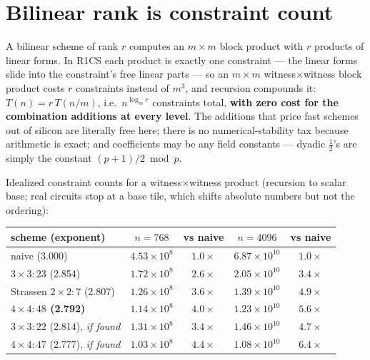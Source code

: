 \documentclass[10pt]{article}
\begin{document}
\section{Bilinear rank is constraint count}\label{sec:rank}

A bilinear scheme of rank $r$ computes an $m\times m$ block product
with $r$ products of linear forms. In R1CS each product is exactly
one constraint --- the linear forms slide into the constraint's free
linear parts --- so an $m\times m$ witness$\times$witness block
product costs $r$ constraints instead of $m^3$, and recursion
compounds it: $T(n) = r\,T(n/m)$, i.e.\ $n^{\log_m r}$ constraints
total, \textbf{with zero cost for the combination additions at every
level}. The additions that price fast schemes out of silicon are
literally free here; there is no numerical-stability tax because
arithmetic is exact; and coefficients may be any field constants ---
dyadic $\tfrac12$'s are simply the constant $(p+1)/2 \bmod p$.

Idealized constraint counts for a witness$\times$witness product
(recursion to scalar base; real circuits stop at a base tile, which
shifts absolute numbers but not the ordering):

\begin{center}
\begin{tabular}{lcccc}
\toprule
scheme (exponent) & $n=768$ & vs naive & $n=4096$ & vs naive\\
\midrule
naive (3.000) & $4.53\times10^{8}$ & $1.0\times$ & $6.87\times10^{10}$ & $1.0\times$\\
$3{\times}3:23$ (2.854) & $1.72\times10^{8}$ & $2.6\times$ & $2.05\times10^{10}$ & $3.4\times$\\
Strassen $2{\times}2:7$ (2.807) & $1.26\times10^{8}$ & $3.6\times$ & $1.39\times10^{10}$ & $4.9\times$\\
\textbf{$4{\times}4:48$ (2.792)} & $1.14\times10^{8}$ & $\mathbf{4.0\times}$ & $1.23\times10^{10}$ & $\mathbf{5.6\times}$\\
$3{\times}3:22$ (2.814), \emph{if found} & $1.31\times10^{8}$ & $3.4\times$ & $1.46\times10^{10}$ & $4.7\times$\\
$4{\times}4:47$ (2.777), \emph{if found} & $1.03\times10^{8}$ & $4.4\times$ & $1.08\times10^{10}$ & $\mathbf{6.4\times}$\\
\bottomrule
\end{tabular}
\end{center}
\end{document}

